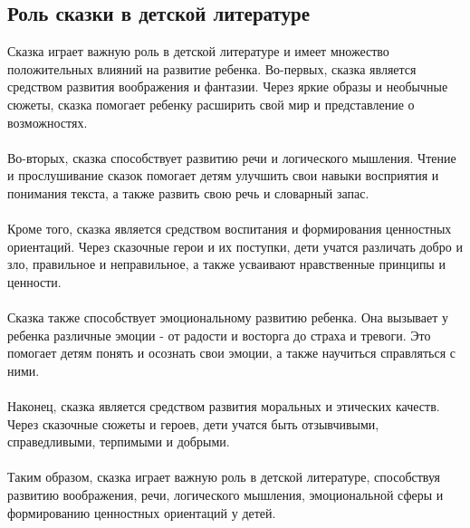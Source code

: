 \documentclass{article}
\begin{document}
\subsection{Роль сказки в детской литературе}
Сказка играет важную роль в детской литературе и имеет множество положительных влияний на развитие ребенка. Во-первых, сказка является средством развития воображения и фантазии. Через яркие образы и необычные сюжеты, сказка помогает ребенку расширить свой мир и представление о возможностях.\\
~\\
Во-вторых, сказка способствует развитию речи и логического мышления. Чтение и прослушивание сказок помогает детям улучшить свои навыки восприятия и понимания текста, а также развить свою речь и словарный запас.\\
~\\
Кроме того, сказка является средством воспитания и формирования ценностных ориентаций. Через сказочные герои и их поступки, дети учатся различать добро и зло, правильное и неправильное, а также усваивают нравственные принципы и ценности.\\
~\\
Сказка также способствует эмоциональному развитию ребенка. Она вызывает у ребенка различные эмоции - от радости и восторга до страха и тревоги. Это помогает детям понять и осознать свои эмоции, а также научиться справляться с ними.\\
~\\
Наконец, сказка является средством развития моральных и этических качеств. Через сказочные сюжеты и героев, дети учатся быть отзывчивыми, справедливыми, терпимыми и добрыми.\\
~\\
Таким образом, сказка играет важную роль в детской литературе, способствуя развитию воображения, речи, логического мышления, эмоциональной сферы и формированию ценностных ориентаций у детей.
\end{document}
